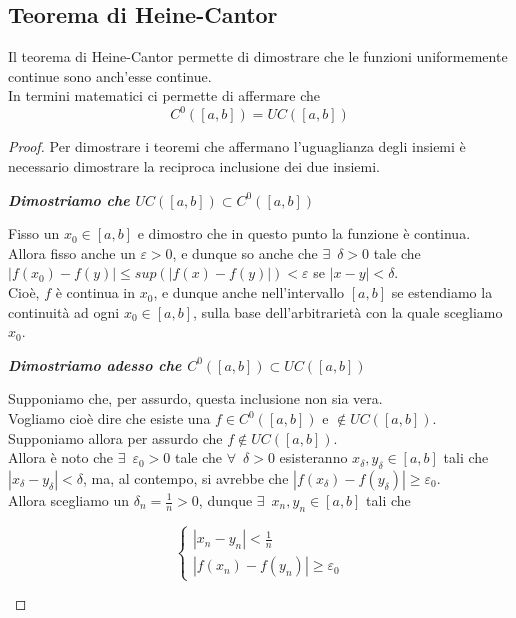 \documentclass{article}
\theoremstyle{definition}
\begin{document}
\subsection{Teorema di Heine-Cantor}
Il teorema di Heine-Cantor permette di dimostrare che le funzioni uniformemente continue sono anch'esse continue.
\\
In termini matematici ci permette di affermare che
\begin{equation*}
    C^0([a,b])=UC([a,b])
\end{equation*}
\begin{proof}
Per dimostrare i teoremi che affermano l'uguaglianza degli insiemi è necessario dimostrare la reciproca inclusione dei due insiemi.
\\
\begin{center}
    \textbf{\textit{Dimostriamo che $ UC([a,b]) \subset C^0([a,b])$}}
\end{center}
    Fisso un $x_0 \in [a,b]$ e dimostro che in questo punto la funzione è continua.
    \\
    Allora fisso anche un $\varepsilon >0$, e dunque so anche che $\exists \,\,\, \delta>0$ tale che $|f(x_0)-f(y)|  \leqslant sup(|f(x)-f(y)|) < \varepsilon$ se $|x-y|<\delta$.
    \\
    Cioè, $f$ è continua in $x_0$, e dunque anche nell'intervallo $[a,b]$ se estendiamo la continuità ad ogni $x_0 \in [a,b]$, sulla base dell'arbitrarietà con la quale scegliamo $x_0$.
    \begin{center}
        \textbf{\textit{Dimostriamo adesso che $  C^0([a,b]) \subset UC([a,b])$}}
    \end{center}
    Supponiamo che, per assurdo, questa inclusione non sia vera.
    \\
    Vogliamo cioè dire che esiste una $f \in C^0([a,b])$ e $\notin UC([a,b])$.
    \\
    Supponiamo allora per assurdo che $f \notin UC([a,b])$.
    \\
    Allora è noto che $\exists \,\,\, \varepsilon_0>0$ tale che $\forall \,\,\, \delta>0$ esisteranno $x_\delta, y_\delta \in [a,b]$ tali che $|x_\delta-y_\delta|<\delta$, ma, al contempo, si avrebbe che $|f(x_\delta)-f(y_\delta)|\geqslant \varepsilon_0$.
    \\
    Allora scegliamo un $\delta_n=\frac{1}{n}>0$, dunque $\exists \,\,\, x_n,y_n \in [a,b]$ tali che 
    \begin{center}
    \begin{equation}
    \begin{cases}
        |x_n-y_n|<\frac{1}{n} \\
        |f(x_n)-f(y_n)| \geqslant \varepsilon_0
    \end{cases}
    \end{equation}
    \end{center}
\end{proof}
\end{document}
